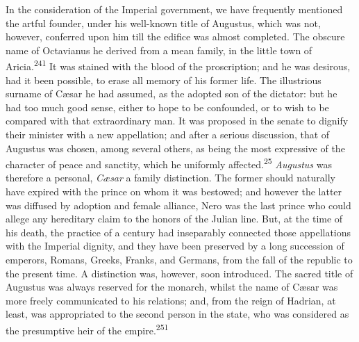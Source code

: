 In the consideration of the Imperial government, we have
frequently mentioned the artful founder, under his well-known
title of Augustus, which was not, however, conferred upon him
till the edifice was almost completed. The obscure name of
Octavianus he derived from a mean family, in the little town of
Aricia.\textsuperscript{241} It was stained with the blood of the proscription;
and he was desirous, had it been possible, to erase all memory of
his former life. The illustrious surname of Cæsar he had assumed,
as the adopted son of the dictator: but he had too much good
sense, either to hope to be confounded, or to wish to be compared
with that extraordinary man. It was proposed in the senate to
dignify their minister with a new appellation; and after a
serious discussion, that of Augustus was chosen, among several
others, as being the most expressive of the character of peace
and sanctity, which he uniformly affected.\textsuperscript{25} \textit{Augustus} was
therefore a personal, \textit{Cæsar} a family distinction. The former
should naturally have expired with the prince on whom it was
bestowed; and however the latter was diffused by adoption and
female alliance, Nero was the last prince who could allege any
hereditary claim to the honors of the Julian line. But, at the
time of his death, the practice of a century had inseparably
connected those appellations with the Imperial dignity, and they
have been preserved by a long succession of emperors, Romans,
Greeks, Franks, and Germans, from the fall of the republic to the
present time. A distinction was, however, soon introduced. The
sacred title of Augustus was always reserved for the monarch,
whilst the name of Cæsar was more freely communicated to his
relations; and, from the reign of Hadrian, at least, was
appropriated to the second person in the state, who was
considered as the presumptive heir of the empire.\textsuperscript{251}


